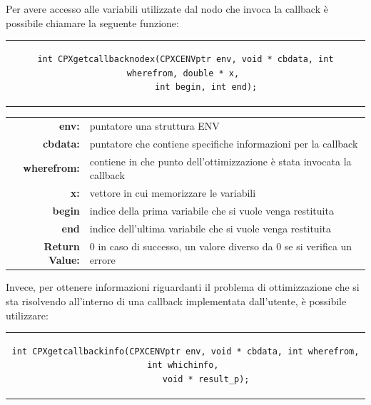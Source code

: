 Per avere accesso alle variabili utilizzate dal nodo che invoca la callback è possibile chiamare la seguente funzione:
\begin{center}
\begin{tabular}{c}
\begin{lstlisting}[linewidth=410pt, basicstyle=\footnotesize\sffamily,]     
int CPXgetcallbacknodex(CPXCENVptr env, void * cbdata, int wherefrom, double * x, 
		int begin, int end);
\end{lstlisting}
\end{tabular}
\end{center}
\begin{table}[h]
\centering
\begin{tabular}{rl}
\textbf{env:} & {puntatore una struttura ENV}\\
\textbf{cbdata:} & {puntatore che contiene specifiche informazioni per la callback}\\
\textbf{wherefrom:} & {contiene in che punto dell'ottimizzazione è stata invocata la callback} \\ 
\textbf{x:} & {vettore in cui memorizzare le variabili} \\
\textbf{begin} & {indice della prima variabile che si vuole venga restituita}\\
\textbf{end} & {indice dell'ultima variabile che si vuole venga restituita}\\  
\textbf{Return Value:} & {0 in caso di successo, un valore diverso da 0 se si verifica un errore}\\                               
\end{tabular}
\end{table}
Invece, per ottenere informazioni riguardanti il problema di ottimizzazione che si sta risolvendo all'interno di una callback implementata dall'utente, è possibile utilizzare:
\begin{center}
\begin{tabular}{c}
\begin{lstlisting}[linewidth=415pt, basicstyle=\footnotesize\sffamily,]  
int CPXgetcallbackinfo(CPXCENVptr env, void * cbdata, int wherefrom, int whichinfo, 
		void * result_p);
\end{lstlisting}
\end{tabular}
\end{center}
